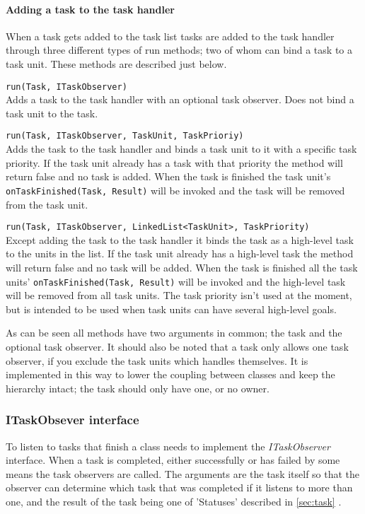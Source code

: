 \paragraph{Adding a task to the task handler}
When a task gets added to the task list 
tasks are added to the task handler through three different types of run methods; two of whom 
can bind a task to a task unit. These methods are described just below.
\begin{description}
\item{\texttt{run(Task, ITaskObserver)}} \\
Adds a task to the task handler with an optional task observer. Does not bind a task unit to the
task.
\item{\texttt{run(Task, ITaskObserver, TaskUnit, TaskPrioriy)}} \\
Adds the task to the task handler and binds a task unit to it with a specific task priority. If the
task unit already has a task with that priority the method will return false and no task is added.
When the task is finished the task unit's \texttt{onTaskFinished(Task, Result)} will be invoked and
the task will be removed from the task unit.
\item{\texttt{run(Task, ITaskObserver, LinkedList<TaskUnit>, TaskPriority)}} \\
Except adding the task to the task handler it binds the task as a high-level
task to the units in the list. If the task unit already has a high-level task the method will return false and
no task will be added. When the task is finished all the task units' \texttt{onTaskFinished(Task, Result)}
will be invoked and the high-level task will be removed from all task units. The task priority isn't
used at the moment, but is intended to be used when task units can have several high-level goals.
\end{description}
As can be seen all methods have two arguments in common; the task and the optional task observer. It
should also be noted that a task only allows one task observer, if you exclude the task units which
handles themselves. It is implemented in this way to lower the coupling between classes and keep the
hierarchy intact; the task should only have one, or no owner.

\subsubsection{ITaskObsever interface}
To listen to tasks that finish a class needs to implement the \emph{ITaskObserver} interface. When
a task is completed, either successfully or has failed by some means the task observers are called.
The arguments are the task itself so that the observer can determine which task that was completed
if it listens to more than one, and the result of the task being one of 'Statuses' described in
\ref{sec:task} .

